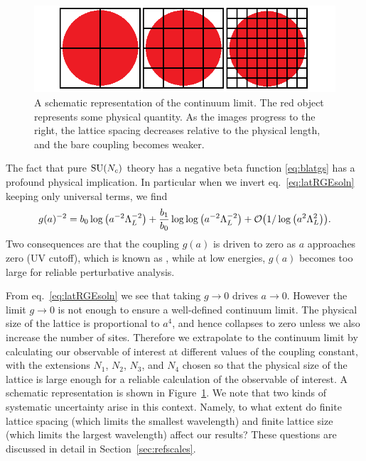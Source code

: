 \begin{figure}
  \centering
  \includegraphics[width=0.9\linewidth]{figs/continuumlimit.png}
  \caption{A schematic representation of the continuum limit. The
           red object represents some physical quantity. As the
           images progress to the right, the lattice spacing decreases
           relative to the physical length, and the bare coupling
           becomes weaker.}
  \label{fig:climit}
\end{figure}

The fact that pure $\operatorname{SU}(N_c)$ theory has a negative beta function
\eqref{eq:blatgs} has a profound physical implication. In particular 
when we invert eq.~\eqref{eq:latRGEsoln} keeping only universal
terms, we find
\begin{equation}\label{eq:rgesoln}
  g(a)^{-2}=b_0\log\left(a^{-2}\Lambda_L^{-2}\right) 
            +\frac{b_1}{b_0}\log\log\left(a^{-2}\Lambda_L^{-2}\right)
            +\order{1/\log\left(a^2\Lambda_L^2\right)}.
\end{equation}
Two consequences are that the coupling $g(a)$ is driven to zero
as $a$ approaches zero (UV cutoff), which is known as 
, while at low energies,
$g(a)$ becomes too large for reliable perturbative analysis.

From eq.~\eqref{eq:latRGEsoln} we see that taking $g\to0$ drives $a\to0$.
However the limit $g\to0$ is not enough to ensure a well-defined continuum
limit. The physical size of the lattice is proportional to $a^4$, and hence
collapses to zero unless we also increase the number of sites. Therefore
we extrapolate to the continuum limit by calculating our observable
of interest at different values of the coupling constant, with the 
extensions $N_1$, $N_2$, $N_3$, and $N_4$ chosen so that the physical 
size of the lattice is large enough for a reliable calculation of 
the observable of interest. A schematic representation is shown in
Figure~\ref{fig:climit}. We note that two kinds of systematic uncertainty 
arise in this context. Namely, to what extent do finite lattice
spacing (which limits the smallest wavelength) and finite lattice
size (which limits the largest wavelength) affect our results?
These questions are discussed in detail in 
Section~\ref{sec:refscales}.

